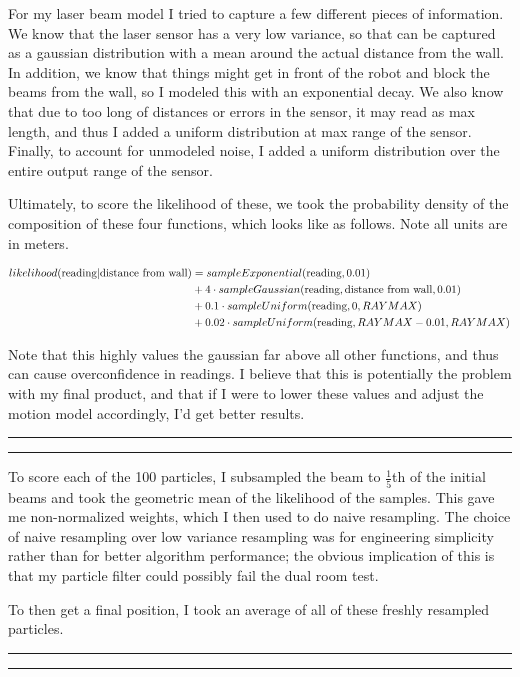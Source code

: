 \documentclass[11pt]{article}
\newcommand{\topic}[1] {\vspace{.25in} \hrule\vspace{0.5em}
  \noindent{\bf #1} \vspace{0.5em}
  \hrule \vspace{.10in}}
\begin{document}
For my laser beam model I tried to capture a few different pieces of
information. We know that the laser sensor has a very low variance, so that can
be captured as a gaussian distribution with a mean around the actual distance
from the wall. In addition, we know that things might get in front of the robot
and block the beams from the wall, so I modeled this with an exponential decay.
We also know that due to too long of distances or errors in the sensor, it may
read as max length, and thus I added a uniform distribution at max range of the
sensor. Finally, to account for unmodeled noise, I added a uniform distribution
over the entire output range of the sensor.

Ultimately, to score the likelihood of these, we took the probability density of
the composition of these four functions, which looks like as follows. Note all
units are in meters.

\begin{align*}
  likelihood(\textup{reading} | \textup{distance from wall})
  &= sampleExponential(\textup{reading}, 0.01)\\
  &+ 4 \cdot sampleGaussian(\textup{reading}, \textup{distance from wall}, 0.01) \\
  &+ 0.1 \cdot sampleUniform(\textup{reading}, 0, RAYMAX) \\
  &+ 0.02 \cdot sampleUniform(\textup{reading}, RAYMAX - 0.01, RAYMAX)
\end{align*}

Note that this highly values the gaussian far above all other functions, and
thus can cause overconfidence in readings. I believe that this is potentially
the problem with my final product, and that if I were to lower these values and
adjust the motion model accordingly, I'd get better results.

\topic{Resampling Procedure}

To score each of the 100 particles, I subsampled the beam to $\frac{1}{5}$th of the initial
beams and took the geometric mean of the likelihood of the samples. This gave me
non-normalized weights, which I then used to do naive resampling. The choice of
naive resampling over low variance resampling was for engineering simplicity
rather than for better algorithm performance; the obvious implication of this is that
my particle filter could possibly fail the dual room test.

To then get a final position, I took an average of all of these freshly
resampled particles.

\topic{Tuning}
\end{document}
